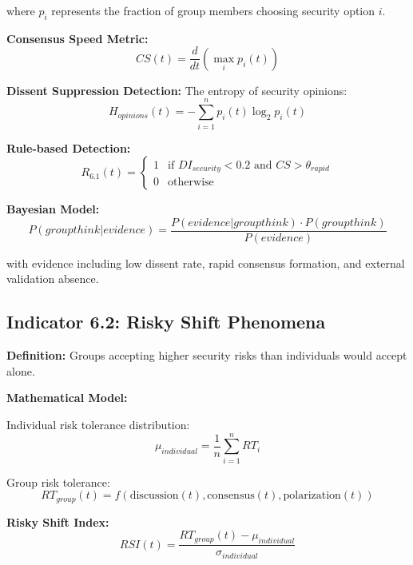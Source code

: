 \documentclass[11pt,a4paper]{article}
\begin{document}
where $p_i$ represents the fraction of group members choosing security option $i$.

\textbf{Consensus Speed Metric:}
\begin{equation}
CS(t) = \frac{d}{dt}\left(\max_i p_i(t)\right)
\end{equation}

\textbf{Dissent Suppression Detection:}
The entropy of security opinions:
\begin{equation}
H_{opinions}(t) = -\sum_{i=1}^n p_i(t) \log_2 p_i(t)
\end{equation}

\textbf{Rule-based Detection:}
\begin{equation}
R_{6.1}(t) = \begin{cases}
1 & \text{if } DI_{security} < 0.2 \text{ and } CS > \theta_{rapid} \\
0 & \text{otherwise}
\end{cases}
\end{equation}

\textbf{Bayesian Model:}
\begin{equation}
P(groupthink|evidence) = \frac{P(evidence|groupthink) \cdot P(groupthink)}{P(evidence)}
\end{equation}

with evidence including low dissent rate, rapid consensus formation, and external validation absence.

\subsection{Indicator 6.2: Risky Shift Phenomena}

\textbf{Definition:} Groups accepting higher security risks than individuals would accept alone.

\textbf{Mathematical Model:}

Individual risk tolerance distribution:
\begin{equation}
\mu_{individual} = \frac{1}{n}\sum_{i=1}^n RT_i
\end{equation}

Group risk tolerance:
\begin{equation}
RT_{group}(t) = f(\text{discussion}(t), \text{consensus}(t), \text{polarization}(t))
\end{equation}

\textbf{Risky Shift Index:}
\begin{equation}
RSI(t) = \frac{RT_{group}(t) - \mu_{individual}}{\sigma_{individual}}
\end{equation}
\end{document}
